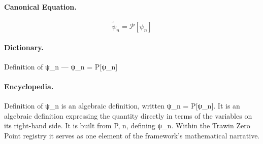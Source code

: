 \paragraph{Canonical Equation.}
\[
\tilde{\psi}_n = \mathcal{P}[\psi_n]
\]

\paragraph{Dictionary.}
Definition of ψ\_n — ψ\_n = P[ψ\_n]

\paragraph{Encyclopedia.}
Definition of ψ\_n is an algebraic definition, written ψ\_n = P[ψ\_n]. It is an algebraic definition expressing the quantity directly in terms of the variables on its right-hand side. It is built from P, n, defining ψ\_n. Within the Trawin Zero Point registry it serves as one element of the framework's mathematical narrative.
